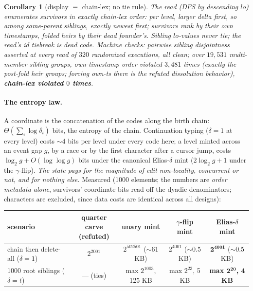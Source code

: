 \documentclass[11pt]{article}
\newtheorem{corollary}{Corollary}
\begin{document}
\begin{corollary}[display $\equiv$ chain-lex; no tie rule]
\label{cor:lex}
The read (DFS by descending $lo$) enumerates survivors in exactly
chain-lex order: per level, larger delta first, so among same-parent
siblings, exactly newest first; survivors rank by their own
timestamps, folded heirs by their dead founder's. Sibling $lo$-values
never tie; the read's id tiebreak is dead code. Machine checks:
pairwise sibling disjointness asserted at every read of $320$
randomized executions, all clean; over $19{,}531$ multi-member sibling
groups, own-timestamp order violated $3{,}481$ times (exactly the
post-fold heir groups; forcing own-ts there is the refuted
dissolution behavior), \textbf{chain-lex violated $0$ times}.
\end{corollary}

\paragraph{The entropy law.} A coordinate is the concatenation of the
codes along the birth chain: $\Theta(\sum_i \log \delta_i)$ bits,
the entropy of the chain. Continuation typing ($\delta = 1$ at every
level) costs $\sim$4 bits per level under every code here; a level
minted across an event gap $g$, by a race or by the first character
after a cursor jump, costs $\log_2 g + O(\log \log g)$ bits under
the canonical Elias-$\delta$ mint ($2\log_2 g + 1$ under the
$\gamma$-flip). \emph{The state pays for the magnitude of edit
non-locality, concurrent or not, and for nothing else.} Measured (1000
elements; the numbers are \emph{order metadata alone}, survivors'
coordinate bits read off the dyadic denominators; characters are
excluded, since data costs are identical across all designs):

\begin{center}\small
\setlength{\tabcolsep}{4.5pt}
\begin{tabular}{@{}lcccc@{}}
\toprule
scenario & \shortstack[c]{quarter carve\\ (refuted)} &
  unary mint & $\gamma$-flip mint & \textbf{Elias-$\delta$ mint} \\
\midrule
chain then delete-all ($\delta{=}1$) & $2^{2001}$ &
  $2^{502501}$ ($\sim$61 KB) & $2^{4001}$ ($\sim$0.5 KB) &
  $\boldsymbol{2^{4001}}$ ($\sim$0.5 KB) \\
1000 root siblings ($\delta{=}t$) & --- (ties) &
  max $2^{1003}$, 125 KB & max $2^{23}$, 5 KB &
  \textbf{max $\boldsymbol{2^{20}}$, 4 KB} \\
\bottomrule
\end{tabular}
\end{center}
\end{document}
